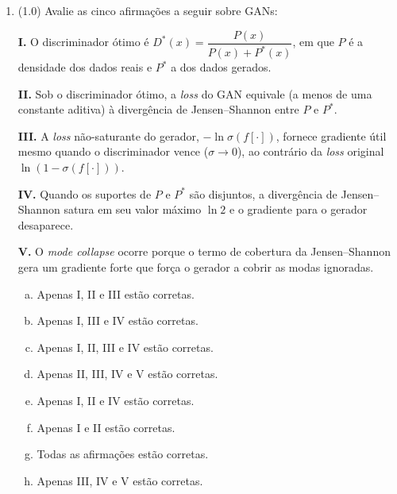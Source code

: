 \documentclass[11pt,a4paper]{article}
\begin{document}
\begin{enumerate}[1)]
\begin{enumerate}[a)]
    \item $y^B = (7,\; 3)$ \quad e \quad $\log\lvert\det J\rvert = 2$.
    \item $y^B = (7,\; 3)$ \quad e \quad $\log\lvert\det J\rvert = 3$.
    \item $y^B = (6,\; 4)$ \quad e \quad $\log\lvert\det J\rvert = \ln 2 \approx 0.693$.
    \item $y^B = (7,\; 4)$ \quad e \quad $\log\lvert\det J\rvert = \ln 2 \approx 0.693$.
    \item $y^B = (7,\; 3)$ \quad e \quad $\log\lvert\det J\rvert = \ln 2 \approx 0.693$.
    \item $y^B = (3,\; 4)$ \quad e \quad $\log\lvert\det J\rvert = 0$.
    \item $y^B = (7,\; 3)$ \quad e \quad $\log\lvert\det J\rvert = 0$.
    \item $y^B = (7,\; 3)$ \quad e \quad $\log\lvert\det J\rvert = 0.5$.
\end{enumerate}

\pagebreak

\item (1.0) Avalie as cinco afirmações a seguir sobre GANs:

\textbf{I.} O discriminador ótimo é $D^{*}(x) = \dfrac{P(x)}{P(x) + P^{*}(x)}$, em que $P$ é a densidade dos dados reais e $P^{*}$ a dos dados gerados.

\textbf{II.} Sob o discriminador ótimo, a \emph{loss} do GAN equivale (a menos de uma constante aditiva) à divergência de Jensen--Shannon entre $P$ e $P^{*}$.

\textbf{III.} A \emph{loss} não-saturante do gerador, $-\ln\sigma(f[\cdot])$, fornece gradiente útil mesmo quando o discriminador vence ($\sigma \to 0$), ao contrário da \emph{loss} original $\ln(1 - \sigma(f[\cdot]))$.

\textbf{IV.} Quando os suportes de $P$ e $P^{*}$ são disjuntos, a divergência de Jensen--Shannon satura em seu valor máximo $\ln 2$ e o gradiente para o gerador desaparece.

\textbf{V.} O \textit{mode collapse} ocorre porque o termo de cobertura da Jensen--Shannon gera um gradiente forte que força o gerador a cobrir as modas ignoradas.

\begin{enumerate}[a)]
    \item Apenas I, II e III estão corretas.
    \item Apenas I, III e IV estão corretas.
    \item Apenas I, II, III e IV estão corretas.
    \item Apenas II, III, IV e V estão corretas.
    \item Apenas I, II e IV estão corretas.
    \item Apenas I e II estão corretas.
    \item Todas as afirmações estão corretas.
    \item Apenas III, IV e V estão corretas.
\end{enumerate}


\end{enumerate}
\end{document}
